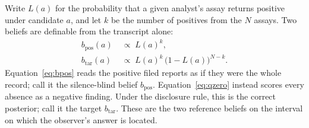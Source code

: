 \documentclass{article}
\theoremstyle{plain}
\theoremstyle{definition}
\theoremstyle{remark}
\newcommand{\bpos}{b_{\mathrm{pos}}}
\newcommand{\btar}{b_{\mathrm{tar}}}         %
\newcommand{\qz}{\btar}                        %
\begin{document}
Write $L(a)$ for the probability that a given analyst's assay returns positive
under candidate $a$, and let $k$ be the number of positives from the $N$
assays. Two beliefs are definable from the transcript alone:
%
\begin{align}
  \bpos(a) &\;\propto\; L(a)^{k}, \label{eq:bpos}\\[2pt]
  \qz(a)   &\;\propto\; L(a)^{k}\,\bigl(1-L(a)\bigr)^{N-k}. \label{eq:qzero}
\end{align}
%
Equation~\eqref{eq:bpos} reads the positive filed reports as if they were the
whole record; call it the silence-blind belief $\bpos$. 
Equation~\eqref{eq:qzero} instead scores every absence as a negative finding. Under the disclosure rule,
this is the correct posterior; call it the target $\btar$. These are the two reference beliefs on 
the interval on which the observer's answer is located. 
\end{document}
